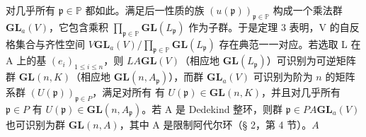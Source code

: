 对几乎所有 \(\mathfrak{p} \in \mathbb{P}\) 都如此。满足后一性质的族 \((u(\mathfrak{p}))_{\mathfrak{p} \in \mathbb{P}}\) 构成一个乘法群 \(\mathbf{GL}_a(V)\)，它包含乘积 \(\prod_{\mathfrak{p} \in \mathbb{P}} \mathbf{GL}(L_{\mathfrak{p}})\) 作为子群。于是定理 3 表明，V 的自反格集合与齐性空间 \(V\)\(\mathbf{GL}_a(V)/\prod_{\mathfrak{p} \in \mathbb{P}} \mathbf{GL}(L_{\mathfrak{p}})\) 存在典范一一对应。若选取 L 在 A 上的基 \((e_i)_{1 \leq i \leq n}\)，则 \(L\)\(A\)\(\mathbf{GL}(V)\)（相应地 \(\mathbf{GL}(L_{\mathfrak{p}})\)）可识别为可逆矩阵群 \(\mathbf{GL}(n, K)\)（相应地 \(\mathbf{GL}(n, A_{\mathfrak{p}})\)），而群 \(\mathbf{GL}_a(V)\) 可识别为阶为 \(n\) 的矩阵系群 \((U(\mathfrak{p}))_{\mathfrak{p} \in P}\)，满足对所有  有 \(U(\mathfrak{p}) \in \mathbf{GL}(n, K)\)，并且对几乎所有 \(\mathfrak{p} \in P\) 有 \(U(\mathfrak{p}) \in \mathbf{GL}(n, A_{\mathfrak{p}})\)。若 A 是 Dedekind 整环，则群 \(\mathfrak{p} \in P\)\(A\)\(\mathbf{GL}_a(V)\) 也可识别为群 \(\mathbf{GL}(n, A)\)，其中 A 是限制阿代尔环（§ 2，第 4 节）。\(A\)

